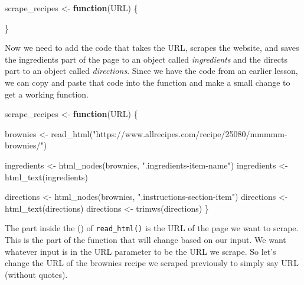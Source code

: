 \documentclass[
]{krantz}
\makeatletter
\newenvironment{Shaded}{\begin{snugshade}}{\end{snugshade}}
\newcommand{\ControlFlowTok}[1]{\textcolor[rgb]{0.27,0.27,0.27}{\textbf{#1}}}
\newcommand{\FunctionTok}[1]{\textcolor[rgb]{0,0,0}{#1}}
\newcommand{\NormalTok}[1]{#1}
\newcommand{\OtherTok}[1]{\textcolor[rgb]{0.37,0.37,0.37}{#1}}
\newcommand{\StringTok}[1]{\textcolor[rgb]{0.5,0.5,0.5}{#1}}
\newenvironment{kframe}{%
\medskip{}
\setlength{\fboxsep}{.8em}
 \def\at@end@of@kframe{}%
 \ifinner\ifhmode%
  \def\at@end@of@kframe{\end{minipage}}%
  \begin{minipage}{\columnwidth}%
 \fi\fi%
 \def\FrameCommand##1{\hskip\@totalleftmargin \hskip-\fboxsep
 \colorbox{shadecolor}{##1}\hskip-\fboxsep
     \hskip-\linewidth \hskip-\@totalleftmargin \hskip\columnwidth}%
 \MakeFramed {\advance\hsize-\width
   \@totalleftmargin\z@ \linewidth\hsize
   \@setminipage}}%
 {\par\unskip\endMakeFramed%
 \at@end@of@kframe}
\renewenvironment{Shaded}{\begin{kframe}}{\end{kframe}}
\makeatother
\begin{document}
\begin{Shaded}
\begin{Highlighting}[]
\NormalTok{scrape\_recipes }\OtherTok{\textless{}{-}} \ControlFlowTok{function}\NormalTok{(URL) \{}
  
\NormalTok{\}}
\end{Highlighting}
\end{Shaded}

Now we need to add the code that takes the URL, scrapes the website, and saves the ingredients part of the page to an object called \emph{ingredients} and the directs part to an object called \emph{directions}. Since we have the code from an earlier lesson, we can copy and paste that code into the function and make a small change to get a working function.

\begin{Shaded}
\begin{Highlighting}[]
\NormalTok{scrape\_recipes }\OtherTok{\textless{}{-}} \ControlFlowTok{function}\NormalTok{(URL) \{}
  
\NormalTok{  brownies }\OtherTok{\textless{}{-}} \FunctionTok{read\_html}\NormalTok{(}\StringTok{"https://www.allrecipes.com/recipe/25080/mmmmm{-}brownies/"}\NormalTok{)}
  
\NormalTok{  ingredients }\OtherTok{\textless{}{-}} \FunctionTok{html\_nodes}\NormalTok{(brownies, }\StringTok{".ingredients{-}item{-}name"}\NormalTok{)}
\NormalTok{  ingredients }\OtherTok{\textless{}{-}} \FunctionTok{html\_text}\NormalTok{(ingredients)}
  
\NormalTok{  directions }\OtherTok{\textless{}{-}} \FunctionTok{html\_nodes}\NormalTok{(brownies, }\StringTok{".instructions{-}section{-}item"}\NormalTok{)}
\NormalTok{  directions }\OtherTok{\textless{}{-}} \FunctionTok{html\_text}\NormalTok{(directions)}
\NormalTok{  directions }\OtherTok{\textless{}{-}} \FunctionTok{trimws}\NormalTok{(directions)}
\NormalTok{\}}
\end{Highlighting}
\end{Shaded}

The part inside the () of \texttt{read\_html()} is the URL of the page we want to scrape. This is the part of the function that will change based on our input. We want whatever input is in the URL parameter to be the URL we scrape. So let's change the URL of the brownies recipe we scraped previously to simply say URL (without quotes).
\end{document}
